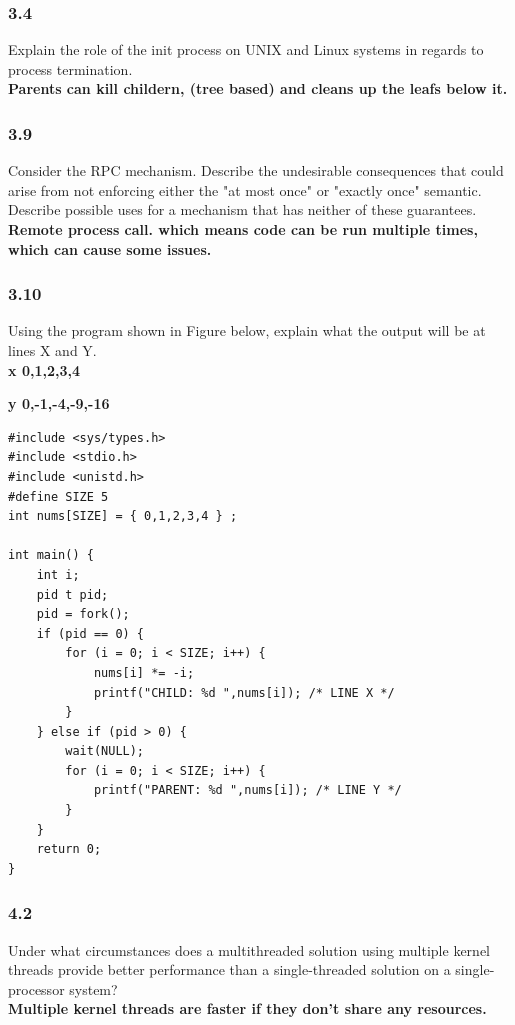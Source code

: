 \documentclass[a4paper,10pt,titlepage]{report}
\begin{document}
\subsubsection{3.4}
Explain the role of the init process on UNIX and Linux systems in regards to process termination.\\
\textbf{Parents can kill childern, (tree based) and cleans up the leafs below it.}\\ \vspace{5mm}


\subsubsection{3.9}
Consider the RPC mechanism. Describe the undesirable consequences that could arise from not enforcing either the "at most once" or "exactly once" semantic. Describe possible uses for a mechanism that has neither of these guarantees.\\
\textbf{Remote process call. which means code can be run multiple times, which can cause some issues.} \\ \vspace{5mm}

\subsubsection{3.10}
Using the program shown in Figure below, explain what the output will be at lines X and Y.\\

\textbf{x { 0,1,2,3,4 }}

\textbf{y { 0,-1,-4,-9,-16 }}

\begin{lstlisting}[frame=single]
#include <sys/types.h>
#include <stdio.h>
#include <unistd.h>
#define SIZE 5
int nums[SIZE] = { 0,1,2,3,4 } ;
 
int main() {
    int i;
    pid t pid;
    pid = fork();
    if (pid == 0) {
        for (i = 0; i < SIZE; i++) {
            nums[i] *= -i;
            printf("CHILD: %d ",nums[i]); /* LINE X */
        }
    } else if (pid > 0) {
        wait(NULL);
        for (i = 0; i < SIZE; i++) {
            printf("PARENT: %d ",nums[i]); /* LINE Y */
        }
    }
    return 0;
}
\end{lstlisting} \vspace{5mm}
\subsubsection{4.2}
Under what circumstances does a multithreaded solution using multiple kernel threads provide better performance than a single-threaded solution on a single-processor system?\\
\textbf{Multiple kernel threads are faster if they don't share any resources.} \\ \vspace{5mm}
\end{document}
